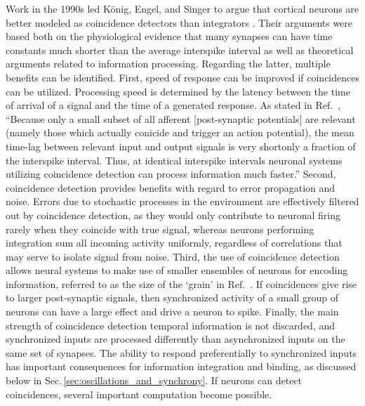 \documentclass[twocolumn]{article}
\newcommand{\onlinecite}[1]{\hspace{-1 ex} \nocite{#1}\citenum{#1}}
\begin{document}
Work in the 1990s led K\"{o}nig, Engel, and Singer to argue that cortical neurons are better modeled as coincidence detectors than integrators \cite{koen1996}. Their arguments were based both on the physiological evidence that many synapses can have time constants much shorter than the average interspike interval as well as theoretical arguments related to information processing. Regarding the latter, multiple benefits can be identified. First, speed of response can be improved if coincidences can be utilized. Processing speed is determined by the latency between the time of arrival of a signal and the time of a generated response. As stated in Ref.\,\onlinecite{koen1996}, ``Because only a small subset of all afferent [post-synaptic potentials] are relevant (namely those which actually conicide and trigger an action potential), the mean time-lag between relevant input and output signals is very short\textemdash only a fraction of the interspike interval. Thus, at identical interspike intervals neuronal systems utilizing coincidence detection can process information much faster.'' Second, coincidence detection provides benefits with regard to error propagation and noise. Errors due to stochastic processes in the environment are effectively filtered out by coincidence detection, as they would only contribute to neuronal firing rarely when they coincide with true signal, whereas neurons performing integration sum all incoming activity uniformly, regardless of correlations that may serve to isolate signal from noise. Third, the use of coincidence detection allows neural systems to make use of smaller ensembles of neurons for encoding information, referred to as the size of the `grain' in Ref.\,\onlinecite{koen1996}. If coincidences give rise to larger post-synaptic signals, then synchronized activity of a small group of neurons can have a large effect and drive a neuron to spike. Finally, the main strength of coincidence detection temporal information is not discarded, and synchronized inputs are processed differently than asynchronized inputs on the same set of synapses. The ability to respond preferentially to synchronized inputs has important consequences for information integration and binding, as discussed below in Sec.\,\ref{sec:oscillations_and_synchrony}. If neurons can detect coincidences, several important computation become possible. 
\end{document}
